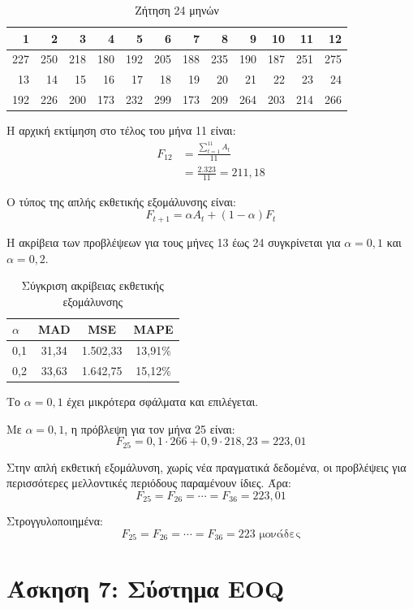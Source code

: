 \documentclass[12pt,a4paper]{article}
\begin{document}
\begin{table}[H]
\centering
\caption{Ζήτηση 24 μηνών}
\begin{tabular}{rrrrrrrrrrrr}
\toprule
1 & 2 & 3 & 4 & 5 & 6 & 7 & 8 & 9 & 10 & 11 & 12 \\
\midrule
227 & 250 & 218 & 180 & 192 & 205 & 188 & 235 & 190 & 187 & 251 & 275 \\
\midrule
13 & 14 & 15 & 16 & 17 & 18 & 19 & 20 & 21 & 22 & 23 & 24 \\
\midrule
192 & 226 & 200 & 173 & 232 & 299 & 173 & 209 & 264 & 203 & 214 & 266 \\
\bottomrule
\end{tabular}
\end{table}

Η αρχική εκτίμηση στο τέλος του μήνα 11 είναι:
\[
\begin{aligned}
F_{12} &= \frac{\sum_{t=1}^{11} A_t}{11} \\
       &= \frac{2.323}{11}=211{,}18
\end{aligned}
\]

Ο τύπος της απλής εκθετικής εξομάλυνσης είναι:
\[
F_{t+1}=\alpha A_t+(1-\alpha)F_t
\]

Η ακρίβεια των προβλέψεων για τους μήνες 13 έως 24 συγκρίνεται για \(\alpha=0{,}1\) και \(\alpha=0{,}2\).

\begin{table}[H]
\centering
\caption{Σύγκριση ακρίβειας εκθετικής εξομάλυνσης}
\begin{tabular}{lccc}
\toprule
\(\alpha\) & \textbf{MAD} & \textbf{MSE} & \textbf{MAPE} \\
\midrule
0,1 & 31,34 & 1.502,33 & 13,91\% \\
0,2 & 33,63 & 1.642,75 & 15,12\% \\
\bottomrule
\end{tabular}
\end{table}

Το \(\alpha=0{,}1\) έχει μικρότερα σφάλματα και επιλέγεται.

Με \(\alpha=0{,}1\), η πρόβλεψη για τον μήνα 25 είναι:
\[
F_{25}=0{,}1\cdot266+0{,}9\cdot218{,}23=223{,}01
\]

Στην απλή εκθετική εξομάλυνση, χωρίς νέα πραγματικά δεδομένα, οι προβλέψεις για περισσότερες μελλοντικές περιόδους παραμένουν ίδιες. Άρα:
\[
F_{25}=F_{26}=\cdots=F_{36}=223{,}01
\]

Στρογγυλοποιημένα:
\[
\boxed{F_{25}=F_{26}=\cdots=F_{36}=223 \text{ μονάδες}}
\]

\section{Άσκηση 7: Σύστημα EOQ}
\end{document}
